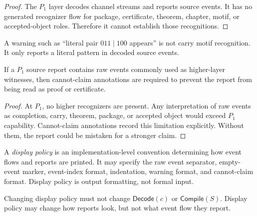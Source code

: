 \begin{proof}
The $P_1$ layer decodes channel streams and reports source events. It has no generated recognizer flow for package, certificate, theorem, chapter, motif, or accepted-object roles. Therefore it cannot establish those recognitions.
\end{proof}

\begin{corollary}
\label{cor:source-report-warnings-weaker}
A warning such as ``literal pair $011\mid 100$ appears'' is not carry motif recognition. It only reports a literal pattern in decoded source events.
\end{corollary}

\begin{theorem}
\label{thm:source-report-cannot-claims-prevent-overinterpretation}
If a $P_1$ source report contains raw events commonly used as higher-layer witnesses, then cannot-claim annotations are required to prevent the report from being read as proof or certificate.
\end{theorem}

\begin{proof}
At $P_1$, no higher recognizers are present. Any interpretation of raw events as completion, carry, theorem, package, or accepted object would exceed $P_1$ capability. Cannot-claim annotations record this limitation explicitly. Without them, the report could be mistaken for a stronger claim.
\end{proof}

\begin{definition}
\label{def:source-report-display-policy}
A \emph{display policy} is an implementation-level convention determining how event flows and reports are printed. It may specify the raw event separator, empty-event marker, event-index format, indentation, warning format, and cannot-claim format. Display policy is output formatting, not formal input.
\end{definition}

\begin{principle}
\label{prin:source-report-display-policy-not-semantics}
Changing display policy must not change $\mathsf{Decode}(c)$ or $\mathsf{Compile}(S)$. Display policy may change how reports look, but not what event flow they report.
\end{principle}


